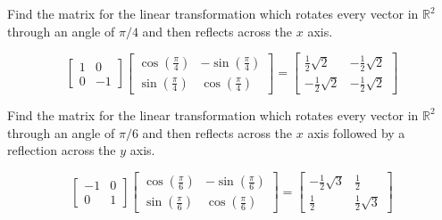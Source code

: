 \documentclass{ximera}
\begin{document}
\begin{problem}\label{prb:6.18} Find the matrix for the linear transformation which rotates every
vector in $\mathbb{R}^{2}$ through an angle of $\pi /4$ and then reflects
across the $x$ axis.
\begin{hint}
\[
\left[
\begin{array}{rr}
1 & 0 \\
0 & -1
\end{array}
\right] \left[
\begin{array}{cc}
\cos \left( \frac{\pi }{4}\right)  & -\sin \left( \frac{\pi }{4}\right)  \\
\sin \left( \frac{\pi }{4}\right)  & \cos \left( \frac{\pi }{4}\right)
\end{array}
\right]  =  \left[
\begin{array}{cc}
\frac{1}{2}\sqrt{2} & -\frac{1}{2}\sqrt{2} \\
-\frac{1}{2}\sqrt{2} & -\frac{1}{2}\sqrt{2}
\end{array}
\right]
\]
\end{hint}
\end{problem}

\begin{problem}\label{prb:6.19} Find the matrix for the linear transformation which rotates every
vector in $\mathbb{R}^{2}$ through an angle of $\pi /6$ and then reflects
across the $x$ axis followed by a reflection across the $y$ axis.
\begin{hint}
\[
\left[
\begin{array}{rr}
-1 & 0 \\
0 & 1
\end{array}
\right] \left[
\begin{array}{cc}
\cos \left( \frac{\pi }{6}\right)  & -\sin \left( \frac{\pi }{6}\right)  \\
\sin \left( \frac{\pi }{6}\right)  & \cos \left( \frac{\pi }{6}\right)
\end{array}
\right] = \left[
\begin{array}{cc}
-\frac{1}{2}\sqrt{3} & \frac{1}{2} \\
\frac{1}{2} & \frac{1}{2}\sqrt{3}
\end{array}
\right]
\]
\end{hint}
\end{problem}
\end{document}
